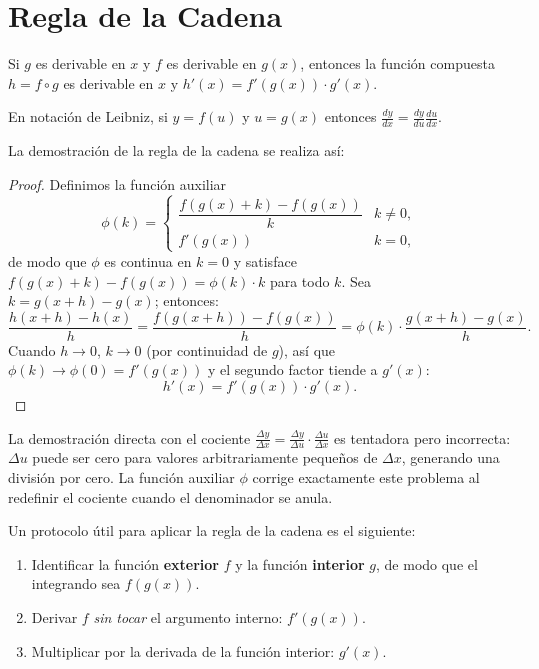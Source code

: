 \section{Regla de la Cadena}

\begin{theorem}
Si $g$ es derivable en $x$ y $f$ es derivable en $g(x)$, entonces la función compuesta $h = f\circ g$ es derivable en $x$ y \(
h'(x) = f'(g(x))\cdot g'(x).
\)


En notación de Leibniz, si $y=f(u)$ y $u=g(x)$ entonces
\(
\frac{dy}{dx} = \frac{dy}{du}\frac{du}{dx}.
\)
\end{theorem}
La demostración de la regla de la cadena se realiza así:
\begin{proof}
Definimos la función auxiliar
\[
\phi(k) =
\begin{cases}
\dfrac{f(g(x)+k)-f(g(x))}{k} & k\neq 0, \\[6pt]
f'(g(x)) & k = 0,
\end{cases}
\]
de modo que $\phi$ es continua en $k=0$ y satisface $f(g(x)+k)-f(g(x))
= \phi(k)\cdot k$ para todo $k$. Sea $k = g(x+h)-g(x)$; entonces:
\[
\frac{h(x+h)-h(x)}{h} = \frac{f(g(x+h))-f(g(x))}{h}
= \phi(k)\cdot\frac{g(x+h)-g(x)}{h}.
\]
Cuando $h\to 0$, $k\to 0$ (por continuidad de $g$), así que
$\phi(k)\to\phi(0)=f'(g(x))$ y el segundo factor tiende a $g'(x)$:
\[
h'(x) = f'(g(x))\cdot g'(x).
\]
\end{proof}

\begin{rem}
La demostración directa con el cociente $\frac{\Delta y}{\Delta x}=
\frac{\Delta y}{\Delta u}\cdot\frac{\Delta u}{\Delta x}$ es tentadora pero
incorrecta: $\Delta u$ puede ser cero para valores arbitrariamente pequeños
de $\Delta x$, generando una división por cero. La función auxiliar $\phi$
corrige exactamente este problema al redefinir el cociente cuando el denominador se anula.
\end{rem}

\begin{rem} Un protocolo útil para aplicar la regla de la cadena es el siguiente:


\begin{enumerate}
    \item Identificar la función \textbf{exterior} $f$ y la función
    \textbf{interior} $g$, de modo que el integrando sea $f(g(x))$.
    \item Derivar $f$ \emph{sin tocar} el argumento interno: $f'(g(x))$.
    \item Multiplicar por la derivada de la función interior: $g'(x)$.
\end{enumerate}
\end{rem}

